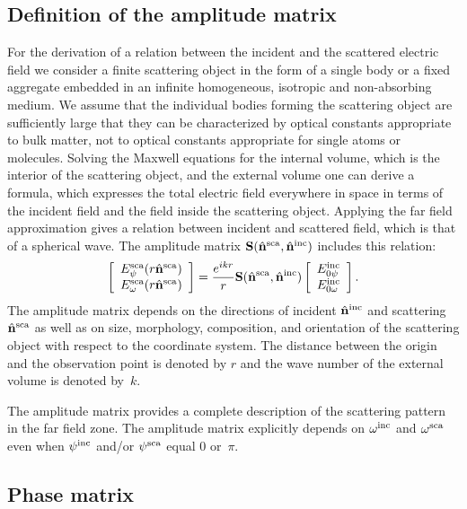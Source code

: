 \subsection{Definition of the amplitude matrix}
\label{sec:rtetheory:amp_mat}

For the derivation of a relation between the incident and the
scattered electric field we consider a finite scattering object in the
form of a single body or a fixed aggregate embedded in an infinite
homogeneous, isotropic and non-absorbing medium. We assume that the
individual bodies forming the scattering object are sufficiently large
that they can be characterized by optical constants appropriate to
bulk matter, not to optical constants appropriate for single atoms or
molecules. Solving the Maxwell equations for the internal volume,
which is the interior of the scattering object, and the external
volume one can derive a formula, which expresses the total electric
field everywhere in space in terms of the incident field and the field
inside the scattering object. Applying the far field approximation
gives a relation between incident and scattered field, which is that
of a spherical wave.  The amplitude matrix
$\mathbf{S}(\hat{{\bf n}}^{\mathrm{sca}},\hat{{\bf n}}^{\mathrm{inc}})$ includes this relation:
\begin{equation}
  \label{eq:rtetheory:amplitude_matrix}
  \ColVctTwo{E_\ZntAng^{\sca}(r\hat{\PDir}^{\sca})}%
         {E_\AzmAng^{\sca}(r\hat{\PDir}^{\sca})}
         = \frac{e^{ikr}}{r}\MtrStl{S}(\hat{\PDir}^{\sca},\hat{\PDir}^{\inc}) 
 \ColVctTwo{E_{0\ZntAng}^{\inc}}%
         {E_{0\AzmAng}^{\inc}}.
\end{equation}
The amplitude matrix depends on the directions of incident
$\hat{{\bf n}}^{\mathrm{inc}}$ and scattering $\hat{{\bf n}}^{\mathrm{sca}}$ as well as on size,
morphology, composition, and orientation of the scattering object with
respect to the coordinate system. The distance between the origin and
the observation point is denoted by $r$ and the wave number of the
external volume is denoted by~$k$.

The amplitude matrix provides a complete description of the scattering
pattern in the far field zone. The amplitude matrix explicitly depends
on $\omega^{\mathrm{inc}}$ and $\omega^{\mathrm{sca}}$ even when $\psi^{\mathrm{inc}}$ and/or
$\psi^{\mathrm{sca}}$ equal 0 or~$\pi$.

\subsection{Phase matrix}
\label{sec:rtetheory:pha_mat}

